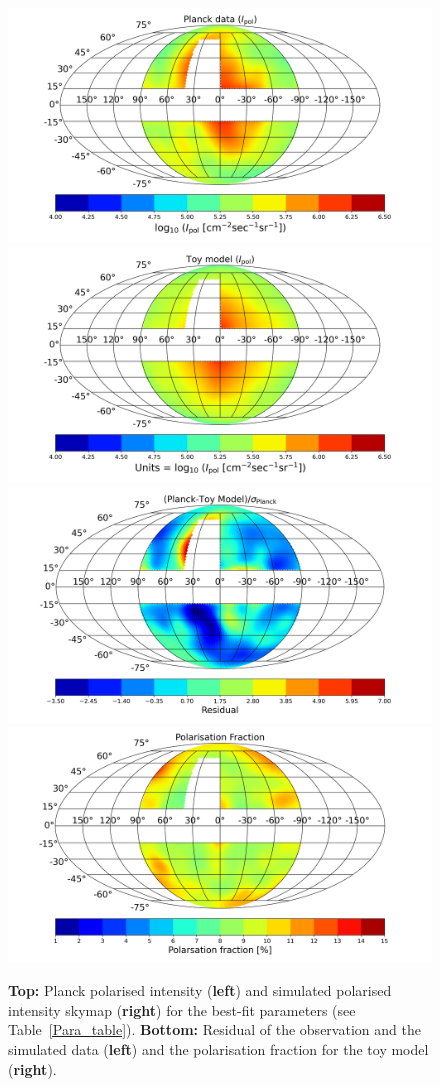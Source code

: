\documentclass[usenatbib]{mnras}
\begin{document}
\begin{figure}
\centering
\includegraphics[width =0.49\linewidth]{Images/Feb-13-2022_Planck_Sky_Map.png}%
\includegraphics[width=0.49\linewidth]{Images/Feb-13-2022Ver1_Skymap_Bstr_3_Btur_6_Rmag_5_Zmag_7_norm_3.76e-13.png}
\includegraphics[width = 0.49\linewidth]{Images/Feb-13-2022_Residue_Bstr_3_Btur_6_Rmag_5_Zmag_7_norm_3.76e-13.png}%
\includegraphics[width =0.49\linewidth]{Images/Feb-13-2022_Pol_Frac_30GHz_Total_Skymap_Bstr_3_Btur_6_Rmag_5_Zmag_7_norm_2.61e-14.png}
\caption{\textbf{Top:} Planck polarised intensity (\textbf{left}) and simulated polarised intensity skymap (\textbf{right}) for the best-fit parameters (see Table~\ref{Para_table}). \textbf{Bottom:} Residual of the observation and the simulated data (\textbf{left}) and the polarisation fraction for the toy model (\textbf{right}).}
\label{fig:Skymaps}
\end{figure}
\end{document}
